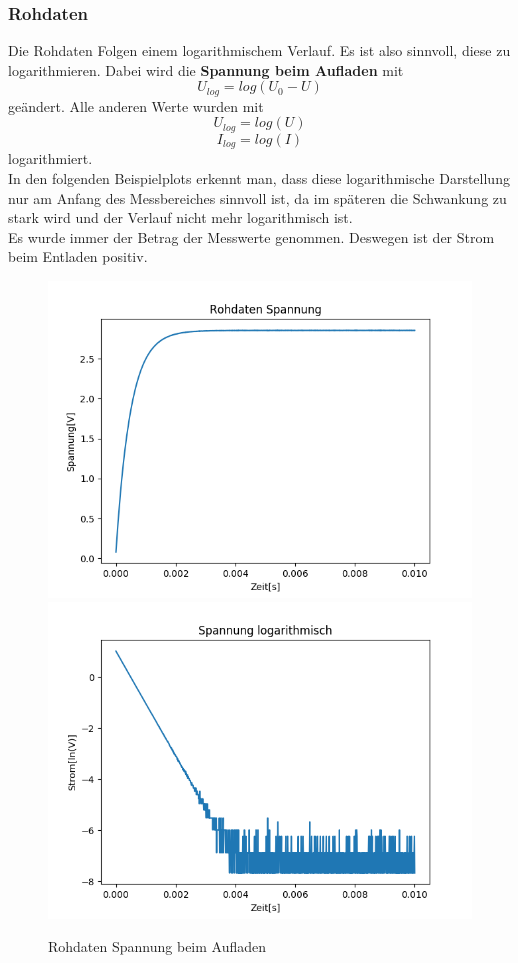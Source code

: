 \documentclass[12pt,a4paper]{article}
\begin{document}
\subsubsection{Rohdaten}
Die Rohdaten Folgen einem logarithmischem Verlauf. Es ist also sinnvoll, diese zu logarithmieren. Dabei wird die \textbf{Spannung beim Aufladen} mit
\begin{equation}
U_{log} = log(U_0-U)
\end{equation}
geändert. Alle anderen Werte wurden mit
\begin{equation}
U_{log} = log(U)
\end{equation}
\begin{equation}
I_{log} = log(I)
\end{equation}
logarithmiert.\\
In den folgenden Beispielplots erkennt man, dass diese logarithmische Darstellung nur am Anfang des Messbereiches sinnvoll ist, da im späteren die Schwankung zu stark wird und der Verlauf nicht mehr logarithmisch ist.\\
Es wurde immer der Betrag der Messwerte genommen. Deswegen ist der Strom beim Entladen positiv.
\begin{figure}[H]
\begin{center}
\includegraphics[width=0.49\linewidth]{Bilder/Kondensator_U}
\includegraphics[width=0.49\linewidth]{Bilder/Kondensator_logU}
\caption[Rohdaten logarith. A]{Rohdaten Spannung beim Aufladen}
\label{fig:RohU}
\end{center}
\end{figure}
\end{document}
